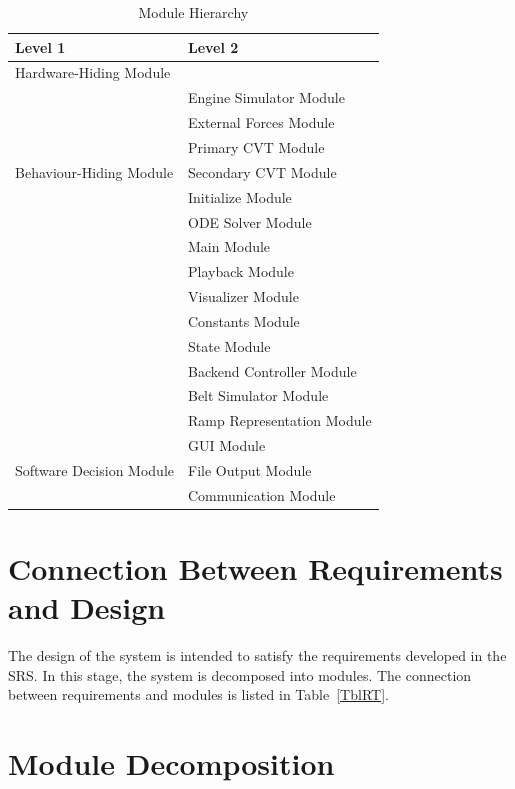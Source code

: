 \documentclass[12pt, titlepage]{article}
\begin{document}
\begin{table}[h!]
\centering
\begin{tabular}{p{} p{}}
\toprule
\textbf{Level 1} & \textbf{Level 2}\\
\midrule

{Hardware-Hiding Module} & ~ \\
\midrule

\multirow{7}{0.3\textwidth}{Behaviour-Hiding Module}
& Engine Simulator Module\\
& External Forces Module\\
& Primary CVT Module\\
& Secondary CVT Module\\
& Initialize Module\\
& ODE Solver Module\\
& Main Module\\ 
& Playback Module\\
& Visualizer Module\\
& Constants Module\\
& State Module\\
& Backend Controller Module\\
& Belt Simulator Module\\
& Ramp Representation Module\\
\midrule

\multirow{3}{0.3\textwidth}{Software Decision Module}
& GUI Module\\
& File Output Module\\
& Communication Module\\
\bottomrule

\end{tabular}
\caption{Module Hierarchy}
\label{TblMH}
\end{table}

\section{Connection Between Requirements and Design} \label{SecConnection}

The design of the system is intended to satisfy the requirements developed in
the SRS. In this stage, the system is decomposed into modules. The connection
between requirements and modules is listed in Table~\ref{TblRT}.


\section{Module Decomposition} \label{SecMD}
\end{document}
